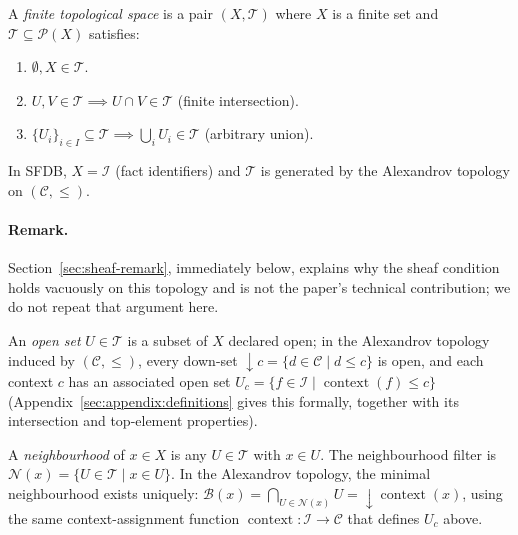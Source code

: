 \begin{definition}
\label{def:topology}
A \emph{finite topological space} is a pair $(X, \mathcal{T})$ where $X$ is a finite set
and $\mathcal{T} \subseteq \mathcal{P}(X)$ satisfies:
\begin{enumerate}
    \item $\emptyset, X \in \mathcal{T}$.
    \item $U, V \in \mathcal{T} \implies U \cap V \in \mathcal{T}$ (finite intersection).
    \item $\{U_i\}_{i \in I} \subseteq \mathcal{T} \implies \bigcup_i U_i \in \mathcal{T}$ (arbitrary union).
\end{enumerate}
In SFDB, $X = \mathcal{I}$ (fact identifiers) and $\mathcal{T}$ is generated
by the Alexandrov topology on $(\mathcal{C}, \leq)$.
\end{definition}

\paragraph{Remark.}
Section~\ref{sec:sheaf-remark}, immediately below, explains why the sheaf
condition holds vacuously on this topology and is not the paper's
technical contribution; we do not repeat that argument here.

An \emph{open set} $U \in \mathcal{T}$ is a subset of $X$ declared open; in
the Alexandrov topology induced by $(\mathcal{C}, \leq)$, every down-set
$\downarrow c = \{d \in \mathcal{C} \mid d \leq c\}$ is open, and each
context $c$ has an associated open set
$U_c = \{f \in \mathcal{I} \mid \operatorname{context}(f) \leq c\}$
(Appendix~\ref{sec:appendix:definitions} gives this formally, together
with its intersection and top-element properties).

\begin{definition}[Neighbourhood]
\label{def:neighbourhood}
A \emph{neighbourhood} of $x \in X$ is any $U \in \mathcal{T}$ with $x \in U$.
The neighbourhood filter is $\mathcal{N}(x) = \{U \in \mathcal{T} \mid x \in U\}$.
In the Alexandrov topology, the minimal neighbourhood exists uniquely:
$\mathcal{B}(x) = \bigcap_{U \in \mathcal{N}(x)} U = \downarrow \operatorname{context}(x)$,
using the same context-assignment function $\operatorname{context}: \mathcal{I} \to \mathcal{C}$
that defines $U_c$ above.
\end{definition}

